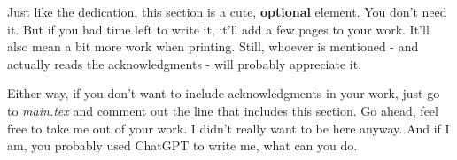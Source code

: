 \begin{agradecimentos}
Just like the dedication, this section is a cute, \textbf{optional} element. You don't need it. But if you had time left to write it, it'll add a few pages to your work. It'll also mean a bit more work when printing. Still, whoever is mentioned - and actually reads the acknowledgments - will probably appreciate it.

Either way, if you don't want to include acknowledgments in your work, just go to \textit{main.tex} and comment out the line that includes this section. Go ahead, feel free to take me out of your work. I didn't really want to be here anyway. And if I am, you probably used ChatGPT to write me, what can you do.

\end{agradecimentos}
